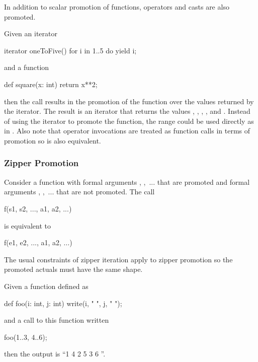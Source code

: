 In addition to scalar promotion of functions, operators and casts are
also promoted.

\begin{example}
Given an iterator
\begin{chapel}
iterator oneToFive() {
  for i in 1..5 do
    yield i;
}
\end{chapel}
and a function
\begin{chapel}
def square(x: int) return x**2;
\end{chapel}
then the call  results in the promotion of
the  function over the values returned by
the  iterator.  The result is an iterator that returns
the values , , , , and .
Instead of using the  iterator to promote
the  function, the range  could be used
directly as in .  Also note that operator
invocations are treated as function calls in terms of promotion
so  is also equivalent.
\end{example}

\subsubsection{Zipper Promotion}
\label{Zipper_Promotion}

Consider a function  with formal
arguments , ,~... that are promoted and formal
arguments , ,~... that are not promoted.  The call
\begin{chapel}
f(s1, s2, ..., a1, a2, ...)
\end{chapel}
is equivalent to
\begin{chapel}
[(e1, e2, ...) in (s1, s2, ...)] f(e1, e2, ..., a1, a2, ...)
\end{chapel}
The usual constraints of zipper iteration apply to zipper promotion so
the promoted actuals must have the same shape.

\begin{example}
Given a function defined as
\begin{chapel}
def foo(i: int, j: int) {
  write(i, " ", j, " ");
}
\end{chapel}
and a call to this function written
\begin{chapel}
foo(1..3, 4..6);
\end{chapel}
then the output is ``1 4 2 5 3 6 ''.
\end{example}

